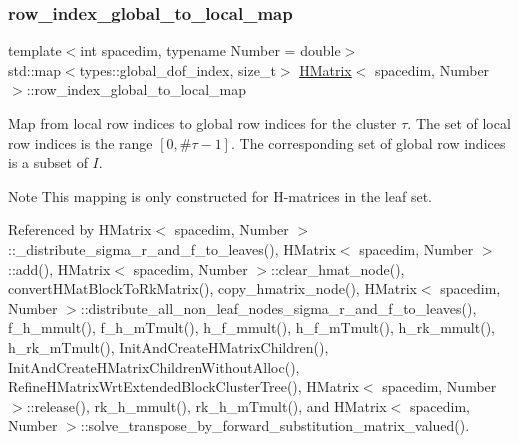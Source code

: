 \mbox{\label{classHMatrix_a4d64145335fc0521603b206a22a67578}} 
\subsubsection{\texorpdfstring{row\+\_\+index\+\_\+global\+\_\+to\+\_\+local\+\_\+map}{row\_index\_global\_to\_local\_map}}
{\footnotesize\ttfamily template$<$int spacedim, typename Number = double$>$ \\
std\+::map$<$types\+::global\+\_\+dof\+\_\+index, size\+\_\+t$>$ \hyperlink{classHMatrix}{H\+Matrix}$<$ spacedim, Number $>$\+::row\+\_\+index\+\_\+global\+\_\+to\+\_\+local\+\_\+map\hspace{0.3cm}{\ttfamily [private]}}

Map from local row indices to global row indices for the cluster $\tau$. The set of local row indices is the range $[0, \#\tau - 1]$. The corresponding set of global row indices is a subset of $I$.


\begin{DoxyDescription}
\item[Note ]This mapping is only constructed for H-\/matrices in the leaf set. 
\end{DoxyDescription}

Referenced by H\+Matrix$<$ spacedim, Number $>$\+::\+\_\+distribute\+\_\+sigma\+\_\+r\+\_\+and\+\_\+f\+\_\+to\+\_\+leaves(), H\+Matrix$<$ spacedim, Number $>$\+::add(), H\+Matrix$<$ spacedim, Number $>$\+::clear\+\_\+hmat\+\_\+node(), convert\+H\+Mat\+Block\+To\+Rk\+Matrix(), copy\+\_\+hmatrix\+\_\+node(), H\+Matrix$<$ spacedim, Number $>$\+::distribute\+\_\+all\+\_\+non\+\_\+leaf\+\_\+nodes\+\_\+sigma\+\_\+r\+\_\+and\+\_\+f\+\_\+to\+\_\+leaves(), f\+\_\+h\+\_\+mmult(), f\+\_\+h\+\_\+m\+Tmult(), h\+\_\+f\+\_\+mmult(), h\+\_\+f\+\_\+m\+Tmult(), h\+\_\+rk\+\_\+mmult(), h\+\_\+rk\+\_\+m\+Tmult(), Init\+And\+Create\+H\+Matrix\+Children(), Init\+And\+Create\+H\+Matrix\+Children\+Without\+Alloc(), Refine\+H\+Matrix\+Wrt\+Extended\+Block\+Cluster\+Tree(), H\+Matrix$<$ spacedim, Number $>$\+::release(), rk\+\_\+h\+\_\+mmult(), rk\+\_\+h\+\_\+m\+Tmult(), and H\+Matrix$<$ spacedim, Number $>$\+::solve\+\_\+transpose\+\_\+by\+\_\+forward\+\_\+substitution\+\_\+matrix\+\_\+valued().

